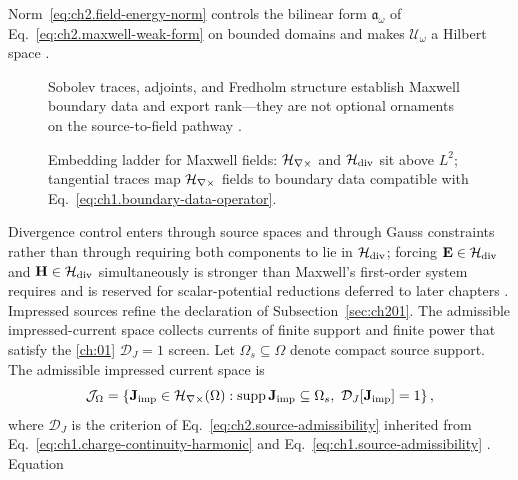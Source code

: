 Norm~\eqref{eq:ch2.field-energy-norm} controls the bilinear form
\(\mathfrak{a}_\omega\) of Eq.~\eqref{eq:ch2.maxwell-weak-form} on bounded domains
and makes \(\mathcal{U}_\omega\) a Hilbert space \cite{stratton1941}.
\begin{figure}[t]
\centering
{}
\caption{Embedding ladder for Maxwell fields: \(\mathcal{H}_{\nabla\times}\) and \(\mathcal{H}_{\mathrm{div}}\) sit above
\(L^{2}\); tangential traces map \(\mathcal{H}_{\nabla\times}\) fields to boundary data compatible with
Eq.~\eqref{eq:ch1.boundary-data-operator}.}
\label{fig:ch2.sobolev-embedding-ladder}
Sobolev traces, adjoints, and Fredholm structure establish Maxwell boundary data and export rank---they are not optional ornaments on the source-to-field pathway \cite{stratton1941}.
\end{figure}
Divergence control enters through source spaces and through Gauss constraints rather
than through requiring both components to lie in \(\mathcal{H}_{\mathrm{div}}\); forcing \(\mathbf{E}\in\mathcal{H}_{\mathrm{div}}\)
and \(\mathbf{H}\in\mathcal{H}_{\mathrm{div}}\) simultaneously is stronger than Maxwell's first-order system
requires and is reserved for scalar-potential reductions deferred to later chapters
\cite{stratton1941}. Impressed sources refine the declaration of Subsection~\ref{sec:ch201}.
The admissible impressed-current space collects currents of finite support and
finite power that satisfy the \ref{ch:01} $\mathcal{D}_J=1$ screen.
Let
\(\Omega_s\subseteq\Omega\) denote compact source support. The admissible impressed
current space is
\begin{equation}
\label{eq:ch2.source-space-refined}
\mathcal{J}_\Omega
=
\left\{
\mathbf{J}_{\mathrm{imp}}\in \mathcal{H}_{\nabla\times}(\Omega):
\operatorname{supp}\mathbf{J}_{\mathrm{imp}}\subseteq\Omega_s,\
\mathcal{D}_{J}[\mathbf{J}_{\mathrm{imp}}]=1
\right\},
\end{equation}
where \(\mathcal{D}_{J}\) is the criterion of
Eq.~\eqref{eq:ch2.source-admissibility} inherited from
Eq.~\eqref{eq:ch1.charge-continuity-harmonic} and
Eq.~\eqref{eq:ch1.source-admissibility} \cite{stratton1941}. Equation
